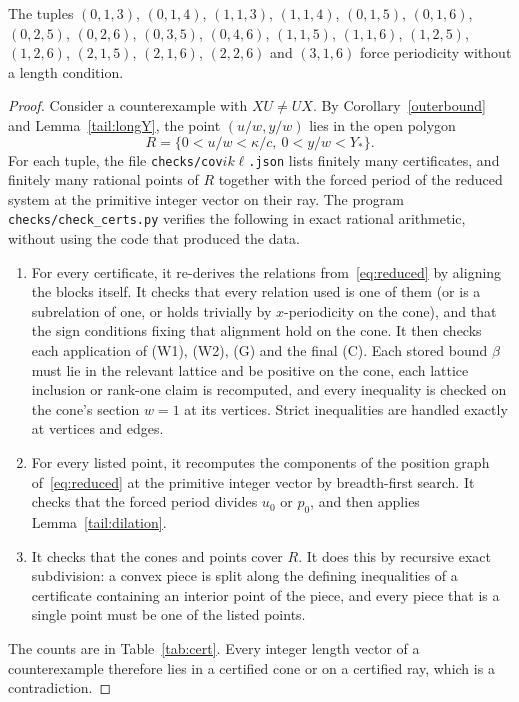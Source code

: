 \begin{theorem}\label{tail:certified}
The tuples \((0,1,3)\), \((0,1,4)\), \((1,1,3)\), \((1,1,4)\), \((0,1,5)\), \((0,1,6)\), \((0,2,5)\), \((0,2,6)\), \((0,3,5)\), \((0,4,6)\), \((1,1,5)\), \((1,1,6)\), \((1,2,5)\), \((1,2,6)\), \((2,1,5)\), \((2,1,6)\), \((2,2,6)\) and \((3,1,6)\) force periodicity without a length condition.
\end{theorem}
\begin{proof}
Consider a counterexample with \(XU\ne UX\). By Corollary~\ref{outerbound} and Lemma~\ref{tail:longY}, the point \((u/w,y/w)\) lies in the open polygon
\[
R=\{0<u/w<\kappa/c,\ 0<y/w<Y_*\}.
\]
For each tuple, the file \texttt{checks/cov\(ik\ell\).json} lists finitely many certificates, and finitely many rational points of \(R\) together with the forced period of the reduced system at the primitive integer vector on their ray. The program \texttt{checks/check\_certs.py} verifies the following in exact rational arithmetic, without using the code that produced the data.
\begin{enumerate}
\item For every certificate, it re-derives the relations from~\eqref{eq:reduced} by aligning the blocks itself. It checks that every relation used is one of them (or is a subrelation of one, or holds trivially by \(x\)-periodicity on the cone), and that the sign conditions fixing that alignment hold on the cone. It then checks each application of (W1), (W2), (G) and the final (C). Each stored bound \(\beta\) must lie in the relevant lattice and be positive on the cone, each lattice inclusion or rank-one claim is recomputed, and every inequality is checked on the cone's section \(w=1\) at its vertices. Strict inequalities are handled exactly at vertices and edges.
\item For every listed point, it recomputes the components of the position graph of~\eqref{eq:reduced} at the primitive integer vector by breadth-first search. It checks that the forced period divides \(u_0\) or \(p_0\), and then applies Lemma~\ref{tail:dilation}.
\item It checks that the cones and points cover \(R\). It does this by recursive exact subdivision: a convex piece is split along the defining inequalities of a certificate containing an interior point of the piece, and every piece that is a single point must be one of the listed points.
\end{enumerate}
The counts are in Table~\ref{tab:cert}. Every integer length vector of a counterexample therefore lies in a certified cone or on a certified ray, which is a contradiction.
\end{proof}

